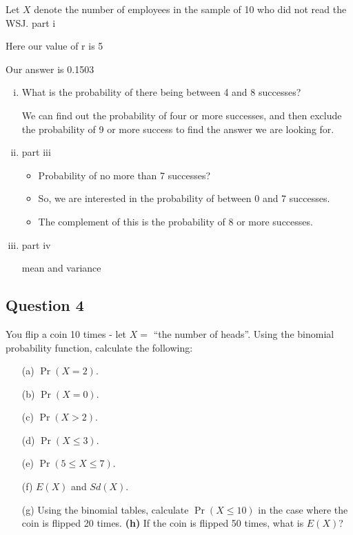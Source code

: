 \documentclass[]{article}
\begin{document}
Let $X$  denote the number of employees in the sample of 10 who did not read the WSJ.
part i



Here our value of  r is 5

Our answer is 0.1503

\begin{enumerate}[(i)]

\item What is the probability of there being between 4 and 8 successes?


We can find out the probability of four or more successes,   and then exclude the probability of 
9 or more success   to find the answer we are looking for.


\item part iii

\begin{itemize}
\item Probability of no more than 7 successes?
\item So, we are interested in the probability of between 0 and 7 successes.
\item The complement of this is the probability of 8 or more successes.
\end{itemize}

\item

part iv

mean and variance

\end{enumerate}


\subsection*{Question 4}

You flip a coin 10 times - let $X =$ ``the number of heads''. Using the binomial probability function, calculate the following:\\[-0.2cm]
\begin{itemize}
\item[(a)] $\Pr(X = 2)$.  \item[(b)] $\Pr(X = 0)$.  \item[(c)]  $\Pr(X > 2)$.  \item[(d)] $\Pr(X \le 3)$.  \item[(e)] $\Pr(5 \le X \le 7)$.   \item[(f)] $E(X)$ and $Sd(X)$.  \item[(g)] Using the binomial tables, calculate $\Pr(X \le10)$ in the case where the coin is flipped 20 times.  {\bf(h)} If the coin is flipped 50 times, what is $E(X)$?
\end{itemize}
\end{document}
